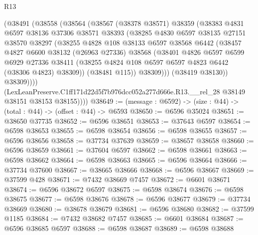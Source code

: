 \begin{lexlean}{R13}
\begin{coremodule}
            (@38491
              (@38558
                (@38564
                  (@38567
                    (@38378 @38571)
                    @38359
                    (@38383
                      @4831
                      @6597
                      @38136
                      @37306
                      @38571
                      @38393
                      (@38285
                        @4830
                        @6597
                        @38135
                        @27151
                        @38570
                        @38297
                        (@38255
                          @4828
                          @108
                          @38133
                          @6597
                          @38568
                          @6442
                          (@38457
                            @4827
                            @6600
                            @38132
                            (@26963 @27336)
                            @38568
                            (@38401
                              @4826
                              @6597
                              @6599
                              @6929
                              @27336
                              @38411
                              (@38255 @4824 @108 @6597 @6597 @4823 @6442 (@38306 @4823) @38309))
                            (@38481 @115))
                          @38309)))
                    (@38419 @38130))
                  @38309))))
          (LexLeanPreserve.C1ff171d22d5f7b976dcc052a277d666e.R13.__rel_28
            @38149
            @38151
            @38153
            @38155))))
@38649 := (message : @6592) -> (size : @44) -> (total : @44) -> (offset : @44) -> @6593
@38650 := @6596 @35024
@38651 := @38650 @37735
@38652 := @6596 @38651
@38653 := @37643 @6597
@38654 := @6598 @38653
@38655 := @6598 @38654
@38656 := @6598 @38655
@38657 := @6596 @38656
@38658 := @37734 @37639
@38659 := @38657 @38658
@38660 := @6596 @38659
@38661 := @37604 @6597
@38662 := @6598 @38661
@38663 := @6598 @38662
@38664 := @6598 @38663
@38665 := @6596 @38664
@38666 := @37734 @37600
@38667 := @38665 @38666
@38668 := @6596 @38667
@38669 := @37599 @428
@38671 := @7432 @38669 @7457
@38672 := @6601 @38671
@38674 := @6596 @38672 @6597
@38675 := @6598 @38674
@38676 := @6598 @38675
@38677 := @6598 @38676
@38678 := @6596 @38677
@38679 := @37734 @38669
@38680 := @38678 @38679
@38681 := @6596 @38680
@38682 := @37599 @1185
@38684 := @7432 @38682 @7457
@38685 := @6601 @38684
@38687 := @6596 @38685 @6597
@38688 := @6598 @38687
@38689 := @6598 @38688

\end{coremodule}
\end{lexlean}
